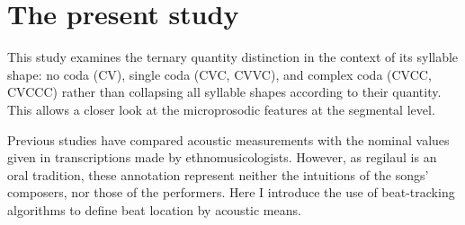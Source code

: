 \section{The present study}

%


This study  examines the ternary quantity distinction in the context of its syllable shape: no coda (CV), single coda (CVC, CVVC), and complex coda (CVCC, CVCCC) rather than collapsing all syllable shapes according to their quantity. This allows a closer look at the microprosodic features at the segmental level. 


  Previous studies have compared acoustic measurements with the nominal values given in transcriptions made by ethnomusicologists. However, as regilaul is an oral tradition, these annotation represent neither the intuitions of the songs' composers, nor those of the performers. Here I introduce the use of beat-tracking algorithms to define beat location by acoustic means. \\
  
%  

